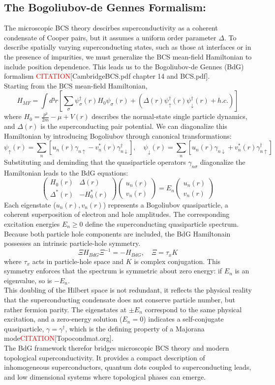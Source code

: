 \documentclass[11pt, letterpaper, titlepage]{article}
\begin{document}
\subsection{The Bogoliubov-de Gennes Formalism:}
The microscopic BCS theory descirbes superconductivity as a coherent condensate of Cooper pairs, but it assumes a uniform order parameter $Δ$. To describe spatially varying superconducting states, such as those at interfaces or in the presence of impurities, we must generalize the BCS mean-field Hamiltonian to include position dependence. This leads us to the Bogoliubov-de Gennes (BdG) formalism \textcolor{red}{CITATION}[CambridgeBCS.pdf chapter 14 and BCS.pdf].\\
Starting from the BCS mean-field Hamiltonian,
$$
H_{MF} = ∫ d³r \left[ ∑_{σ} ψ_{σ}^{†}(r) H_0 ψ_{σ}(r) + (Δ(r) ψ_{↑}^{†}(r) ψ_{↓}^{†}(r) + h.c.) \right]
$$
where $H_0 = \frac{p²}{2m}-μ + V(r)$ describes the normal-state single particle dynamics, and $Δ(r)$ is the superconducting pair potential. We can diagonalize this Hamiltonian by introducing Bogoliubov  through canonical transformations:
$$
ψ_{↑}(r) = ∑_{n} [u_n(r) γ_{n↑} - v_n^{*}(r) γ_{n↓}^{†}], \quad ψ_{↓}(r) = ∑_{n} [u_n(r) γ_{n↓} + v_n^{*}(r) γ_{n↑}^{†}]
$$
Substituting and deminding that the quasiparticle operators $γ_{nσ}$ diagonalize the Hamiltonian leads to the BdG equations:
$$
\begin{pmatrix}
H_0(r) & Δ(r) \\
Δ^{*}(r) & -H_0^{*}(r)
\end{pmatrix}
\begin{pmatrix}
u_n(r) \\
v_n(r)
\end{pmatrix}= E_n
\begin{pmatrix}
u_n(r) \\
v_n(r)
\end{pmatrix}
$$
Each eigenstate ($u_n(r), v_n(r)$) represents a Bogoliubov quasiparticle, a coherent superposition of electron and hole amplitudes. The corresponding excitation energies $E_n ≥ 0$ define the superconducting quasiparticle spectrum.\\
Because both particle hole components are included, the BdG Hamiltonain possesses an intrinsic particle-hole symmetry. 
$$
Ξ H_{BdG} Ξ^{-1} = -H_{BdG}, \quad Ξ = τ_x K
$$
where $τ_x$ acts in particle-hole space and $K$ is complex conjugation. This symmetry enforces that the spectrum is symmetric about zero energy: if $E_n$ is an eigenvalue, so is $-E_n$.\\
This doubling of the Hilbert space is not redundant, it reflects the physical reality that the superconducting condensate does not conserve particle number, but rather fermion parity. The eigenstates at $± E_n$ correspond to the same physical excitation, and a zero-energy solution ($E_n = 0$) indicates a self-conjugate quasiparticle, $γ = γ^{†}$, which is the defining property of a Majorana mode\textcolor{red}{CITATION}[Topocondmat.org].\\
The BdG framework therefor bridges microscopic BCS theory and modern topological superconductivity. It provides a compact description of inhomogeneous superconductors, quantum dots coupled to superconducting leads, and low dimensional systems where topological phases can emerge.
\end{document}

